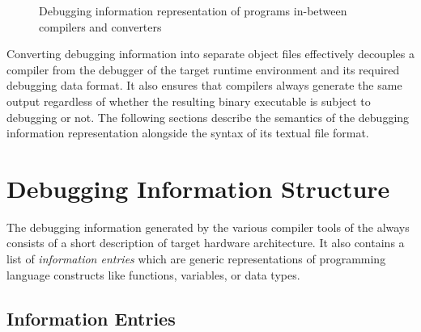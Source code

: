 \begin{figure}
\caption[Debugging information representation of programs]{Debugging information representation of programs in-between compilers and converters}
\label{fig:dbgdataflow}
\end{figure}

Converting debugging information into separate object files effectively decouples a compiler from the debugger of the target runtime environment and its required debugging data format.
It also ensures that compilers always generate the same output regardless of whether the resulting binary executable is subject to debugging or not.
The following sections describe the semantics of the debugging information representation alongside the syntax of its textual file format.

\section{Debugging Information Structure}

The debugging information generated by the various compiler tools of the \ecs{} always consists of a short description of target hardware architecture.
It also contains a list of \emph{information entries} which are generic representations of programming language constructs like functions, variables, or data types.

\subsection{Information Entries}\label{sec:dbginformationentries}

